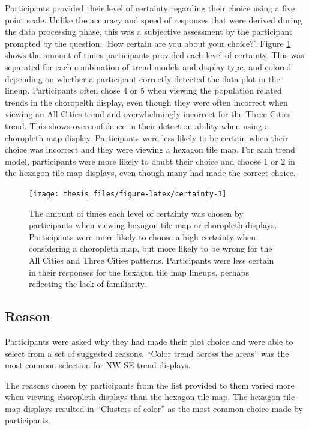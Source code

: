 \documentclass{monashthesis}
\begin{document}
Participants provided their level of certainty regarding their choice using a five point scale.
Unlike the accuracy and speed of responses that were derived during the data processing phase, this was a subjective
assessment by the participant prompted by the question: `How certain are you about your choice?'.
Figure \ref{fig:certainty} shows the amount of times participants provided each level of certainty. This was separated for each combination of trend models and display type, and colored depending on whether a participant correctly detected the data plot in the lineup.
Participants often chose 4 or 5 when viewing the population related trends in the choropelth display, even though they were often incorrect when viewing an All Cities trend and overwhelmingly incorrect for the Three Cities trend. This shows overconfidence in their detection ability when using a choropleth map display. Participants were less likely to be certain when their choice was incorrect and they were viewing a hexagon tile map.
For each trend model, participants were more likely to doubt their choice and choose 1 or 2 in the hexagon tile map displays, even though many had made the correct choice.

\begin{figure}

{\centering \texttt{[image: thesis\_files/figure-latex/certainty-1]} 

}

\caption{The amount of times each level of certainty was chosen by participants when viewing hexagon tile map or choropleth displays. Participants were more likely to choose a high certainty when considering a choropleth map, but more likely to be wrong for the All Cities and Three Cities patterns. Participants were less certain in their responses for the hexagon tile map lineups, perhaps reflecting the lack of familiarity.}\label{fig:certainty}
\end{figure}

\hypertarget{reason}{%
\subsection{Reason}\label{reason}}

Participants were asked why they had made their plot choice and were able to select from a set of suggested reasons.
``Color trend across the areas'' was the most common selection for NW-SE trend displays.

The reasons chosen by participants from the list provided to them varied more when viewing choropleth displays than the hexagon tile map.
The hexagon tile map displays resulted in ``Clusters of color'' as the most common choice made by participants.
\end{document}
